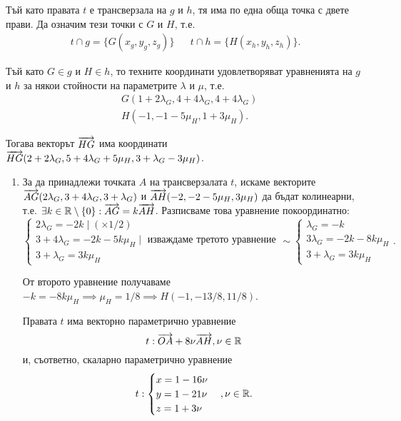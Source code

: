 \documentclass[numbers=endperiod, DIV=15]{scrartcl}
\begin{document}
\begin{solution}
  Тъй като правата $t$ е трансверзала на $g$ и $h$, тя има по една обща точка с двете прави. Да означим тези точки с $G$ и $H$, т.е.
  \begin{align*}
    t \cap g = \{ G(x_g, y_g, z_g) \}
    &&
    t \cap h = \{ H(x_h, y_h, z_h) \}.
  \end{align*}

  Тъй като $G \in g$ и $H \in h$, то техните координати удовлетворяват уравненията на $g$ и $h$ за някои стойности на параметрите $\lambda$ и $\mu$, т.е.
  \begin{align*}
    &G(1 + 2\lambda_G, 4 + 4\lambda_G, 4 + 4\lambda_G) \\
    &H(-1, -1 -5\mu_H, 1 + 3\mu_H).
  \end{align*}

  Тогава векторът $\overrightarrow{HG}$ има координати $\overrightarrow{HG}(2 + 2\lambda_G, 5 + 4\lambda_G + 5\mu_H, 3 + \lambda_G - 3\mu_H)$.

  \begin{enumerate}[label=\alph*)]
    \item За да принадлежи точката $A$ на трансверзалата $t$, искаме векторите $\overrightarrow{AG}(2\lambda_G, 3 + 4\lambda_G, 3 + \lambda_G)$ и $\overrightarrow{AH}(-2, -2 - 5\mu_H, 3\mu_H)$ да бъдат колинеарни, т.е. $\exists k \in \mathbb{R} \setminus \{ 0 \}: \overrightarrow{AG} = k\overrightarrow{AH}$. Разписваме това уравнение покоординатно:
    \begin{displaymath}
      \begin{cases}
        2\lambda_G = -2k \mid (\times 1 / 2) \\
        3 + 4\lambda_G = -2k - 5k\mu_H \mid \text{ изваждаме третото уравнение} \\
        3 + \lambda_G = 3k\mu_H
      \end{cases}
      \sim
      \begin{cases}
        \lambda_G = -k \\
        3\lambda_G = -2k - 8k\mu_H \\
        3 + \lambda_G = 3k\mu_H
      \end{cases}.
    \end{displaymath}

    От второто уравнение получаваме $-k = -8k\mu_H \implies \mu_H = 1 / 8 \implies H(-1, -13/8, 11/8)$.

    Правата $t$ има векторно параметрично уравнение
    \begin{displaymath}
      t: \overrightarrow{OA} + 8 \nu \overrightarrow{AH}, \nu \in \mathbb{R}
    \end{displaymath}
    и, съответно, скаларно параметрично уравнение
    \begin{displaymath}
      t: \begin{cases}
        x = 1 - 16\nu \\
        y = 1 - 21 \nu \\
        z = 1 + 3 \nu
      \end{cases},
      \nu \in \mathbb{R}.
    \end{displaymath}


\end{enumerate}
\end{solution}
\end{document}
